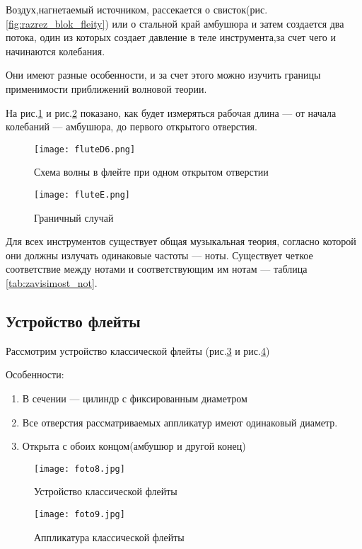 Воздух,нагнетаемый источником, рассекается о свисток(рис.\ref{fig:razrez_blok_fleity}) или о стальной край амбушюра и затем создается два потока, один из которых создает давление в теле инструмента,за счет чего и начинаются колебания.

Они имеют разные особенности, и за счет этого можно изучить границы применимости приближений волновой теории.

На рис.\ref{fig:shema_volny_in_flute} и рис.\ref{fig:granichniy_sluchai} показано, как будет измеряться рабочая 
длина --- от начала колебаний --- амбушюра, до первого открытого отверстия.
\begin{figure}[!ht]
    \centering
    \texttt{[image: fluteD6.png]}
    \caption{Схема волны в флейте при одном открытом отверстии}
    \label{fig:shema_volny_in_flute}
\end{figure}
\begin{figure}[!ht]
    \centering
    \texttt{[image: fluteE.png]}
    \caption{Граничный случай}
    \label{fig:granichniy_sluchai}
\end{figure}
Для всех инструментов существует общая музыкальная теория, согласно которой они должны излучать одинаковые 
частоты --- ноты. Существует четкое соответствие между нотами и соответствующим им нотам --- таблица \ref{tab:zavisimost_not}.

\subsection{Устройство флейты}

Рассмотрим устройство классической флейты (рис.\ref{fig:classical_fleita} и рис.\ref{fig:applicatyra_classical_fleita})

Особенности:
\begin{enumerate}
    \item В сечении --- цилиндр с фиксированным диаметром
    \item Все отверстия рассматриваемых аппликатур имеют одинаковый диаметр.
    \item Открыта с обоих концом(амбушюр и другой конец)
\end{enumerate}

\begin{figure}[!ht]
    \centering
    \texttt{[image: foto8.jpg]}
    \caption{Устройство классической флейты}
    \label{fig:classical_fleita}
\end{figure}
\begin{figure}[!ht]
    \centering
    \texttt{[image: foto9.jpg]}
    \caption{Аппликатура классической флейты}
    \label{fig:applicatyra_classical_fleita}
\end{figure}

